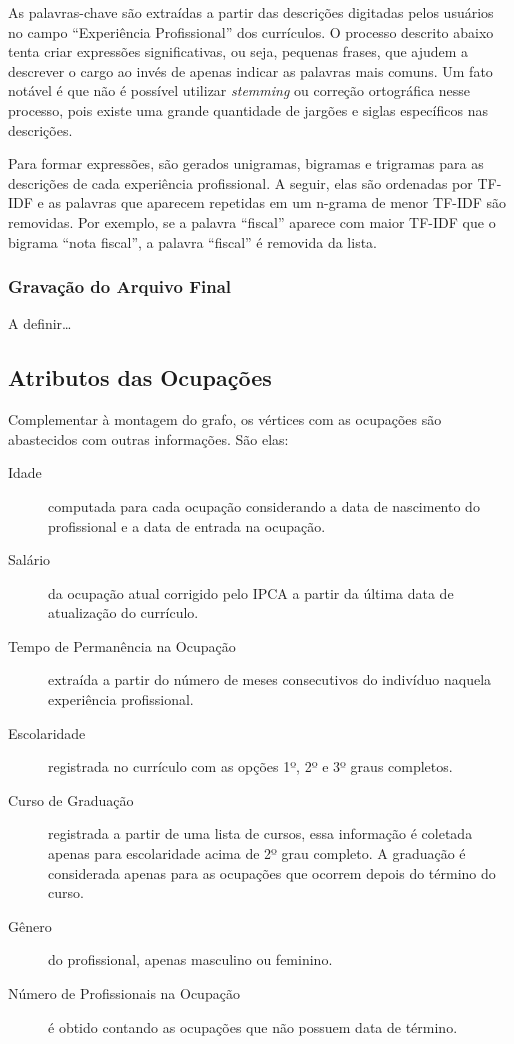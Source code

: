 \documentclass[12pt,a4paper,final]{article}
\begin{document}
As palavras-chave são extraídas a partir das descrições digitadas pelos usuários no campo \enquote{Experiência Profissional} dos currículos. O processo descrito abaixo tenta criar expressões significativas, ou seja, pequenas frases, que ajudem a descrever o cargo ao invés de apenas indicar as palavras mais comuns. Um fato notável é que não é possível utilizar \textit{stemming} ou correção ortográfica nesse processo, pois existe uma grande quantidade de jargões e siglas específicos nas descrições.

Para formar expressões, são gerados unigramas, bigramas e trigramas para as descrições de cada experiência profissional. A seguir, elas são ordenadas por TF-IDF e as palavras que aparecem repetidas em um n-grama de menor TF-IDF são removidas. Por exemplo, se a palavra \enquote{fiscal} aparece com maior TF-IDF que o bigrama \enquote{nota fiscal}, a palavra \enquote{fiscal} é removida da lista.


\subsubsection{Gravação do Arquivo Final}

A definir\ldots

\subsection{Atributos das Ocupações}

Complementar à montagem do grafo, os vértices com as ocupações são abastecidos com outras informações. São elas:

\begin{description}
  \item[Idade] computada para cada ocupação considerando a data de nascimento do profissional e a data de entrada na ocupação.
  \item[Salário] da ocupação atual corrigido pelo IPCA a partir da última data de atualização do currículo.
  \item[Tempo de Permanência na Ocupação] extraída a partir do número de meses consecutivos do indivíduo naquela experiência profissional.
  \item[Escolaridade] registrada no currículo com as opções 1º, 2º e 3º graus completos.
  \item[Curso de Graduação] registrada a partir de uma lista de cursos, essa informação é coletada apenas para escolaridade acima de 2º grau completo. A graduação é considerada apenas para as ocupações que ocorrem depois do término do curso.
  \item[Gênero] do profissional, apenas masculino ou feminino.
  \item[Número de Profissionais na Ocupação] é obtido contando as ocupações que não possuem data de término.
\end{description}
\end{document}
